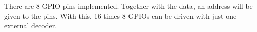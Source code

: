 There are 8 GPIO pins implemented. Together with the data, an address will be given to the pins. With this, 16 times 8 GPIOs can be driven with just one external decoder.